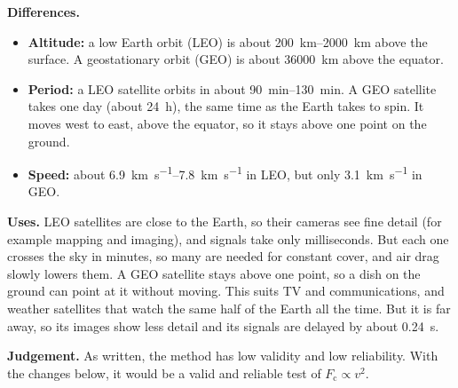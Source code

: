 \begin{practiceanswers}
\begin{practiceans}
\begin{modelanswer}
  \textbf{Differences.}
  \begin{itemize}
    \item \textbf{Altitude:} a low Earth orbit (LEO) is about \qtyrange{200}{2000}{km} above
          the surface. A geostationary orbit (GEO) is about \qty{36000}{km} above the equator.
    \item \textbf{Period:} a LEO satellite orbits in about \qtyrange{90}{130}{min}. A GEO
          satellite takes one day (about \qty{24}{h}), the same time as the Earth takes to spin. It
          moves west to east, above the equator, so it stays above one point on the ground.
    \item \textbf{Speed:} about \qtyrange{6.9}{7.8}{km.s^{-1}} in LEO, but only \qty{3.1}{km.s^{-1}} in
          GEO.
  \end{itemize}

  \textbf{Uses.} LEO satellites are close to the Earth, so their cameras see fine detail (for
  example mapping and imaging), and signals take only milliseconds. But each one crosses the
  sky in minutes, so many are needed for constant cover, and air drag slowly lowers them. A
  GEO satellite stays above one point, so a dish on the ground can point at it without moving.
  This suits TV and communications, and weather satellites that watch the same half of the
  Earth all the time. But it is far away, so its images show less detail and its signals are
  delayed by about \qty{0.24}{s}.
  \end{modelanswer}
  \begin{markingcriteria}
  \end{markingcriteria}
\end{practiceans}

\begin{practiceans}
  \begin{modelanswer}
  \textbf{Judgement.} As written, the method has low validity and low reliability. With the
  changes below, it would be a valid and reliable test of $F_\mathrm{c} \propto v^2$.


\end{modelanswer}
\end{practiceans}
\end{practiceanswers}
